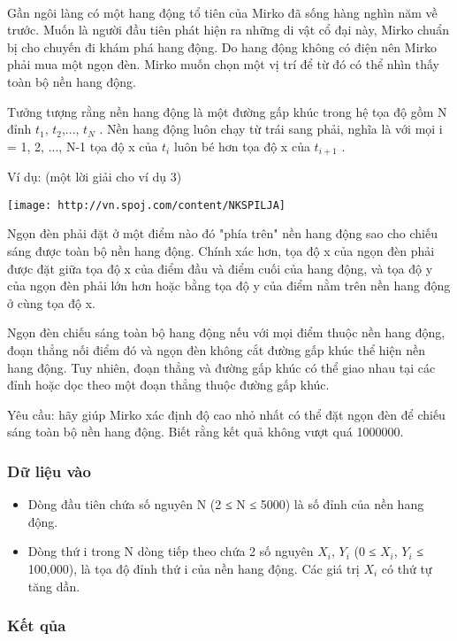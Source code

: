 

 

Gần ngôi làng có một hang động tổ tiên của Mirko đã sống hàng nghìn năm về trước. Muốn là người đầu tiên phát hiện ra những di vật cổ đại này, Mirko chuẩn bị cho chuyến đi khám phá hang động. Do hang động không có điện nên Mirko phải mua một ngọn đèn. Mirko muốn chọn một vị trí để từ đó có thể nhìn thấy toàn bộ nền hang động.

Tưởng tượng rằng nền hang động là một đường gấp khúc trong hệ tọa độ gồm N đỉnh $t_{1}$, $t_{2}$,..., $t_{N}$ . Nền hang động luôn chạy từ trái sang phải, nghĩa là với mọi i = 1, 2, ..., N-1 tọa độ x của $t_{i}$ luôn bé hơn tọa độ x của $t_{i+1}$ .

Ví dụ: (một lời giải cho ví dụ 3)


\texttt{[image: http://vn.spoj.com/content/NKSPILJA]}

Ngọn đèn phải đặt ở một điểm nào đó "phía trên" nền hang động sao cho chiếu sáng được toàn bộ nền hang động. Chính xác hơn, tọa độ x của ngọn đèn phải được đặt giữa tọa độ x của điểm đầu và điểm cuối của hang động, và tọa độ y của ngọn đèn phải lớn hơn hoặc bằng tọa độ y của điểm nằm trên nền hang động ở cùng tọa độ x.

Ngọn đèn chiếu sáng toàn bộ hang động nếu với mọi điểm thuộc nền hang động, đoạn thẳng nối điểm đó và ngọn đèn không cắt đường gấp khúc thể hiện nền hang động. Tuy nhiên, đoạn thẳng và đường gấp khúc có thể giao nhau tại các đỉnh hoặc dọc theo một đoạn thẳng thuộc đường gấp khúc.

Yêu cầu: hãy giúp Mirko xác định độ cao nhỏ nhất có thể đặt ngọn đèn để chiếu sáng toàn bộ nền hang động. Biết rằng kết quả không vượt quá 1000000.

\subsubsection{Dữ liệu vào}
\begin{itemize}
	\item Dòng đầu tiên chứa số nguyên N (2 ≤ N ≤ 5000) là số đỉnh của nền hang động.
	\item Dòng thứ i trong N dòng tiếp theo chứa 2 số nguyên $X_{i}$, $Y_{i}$ (0 ≤ $X_{i}$, $Y_{i}$ ≤ 100,000), là tọa độ đỉnh thứ i của nền hang động. Các giá trị $X_{i}$ có thứ tự tăng dần.
\end{itemize}

\subsubsection{Kết qủa}

